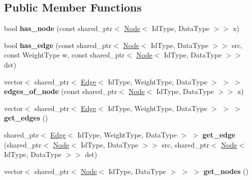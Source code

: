 \subsection*{Public Member Functions}
\begin{DoxyCompactItemize}
\item 
\mbox{\label{class_graph_a_l_a353837400673848253837aac9f8e371f}} 
bool {\bfseries has\+\_\+node} (const shared\+\_\+ptr$<$ \hyperlink{class_node}{Node}$<$ Id\+Type, Data\+Type $>$$>$ x)
\item 
\mbox{\label{class_graph_a_l_a656576f66ccc01e7e304d1185c964613}} 
bool {\bfseries has\+\_\+edge} (const shared\+\_\+ptr$<$ \hyperlink{class_node}{Node}$<$ Id\+Type, Data\+Type $>$$>$ src, const Weight\+Type w, const shared\+\_\+ptr$<$ \hyperlink{class_node}{Node}$<$ Id\+Type, Data\+Type $>$$>$ dst)
\item 
\mbox{\label{class_graph_a_l_a545256531ab0dd576f15e8ca1d948ad2}} 
vector$<$ shared\+\_\+ptr$<$ \hyperlink{class_edge}{Edge}$<$ Id\+Type, Weight\+Type, Data\+Type $>$ $>$ $>$ {\bfseries edges\+\_\+of\+\_\+node} (const shared\+\_\+ptr$<$ \hyperlink{class_node}{Node}$<$ Id\+Type, Data\+Type $>$$>$ x)
\item 
\mbox{\label{class_graph_a_l_a8057925080207f6b03eed78cd6fe89c1}} 
vector$<$ shared\+\_\+ptr$<$ \hyperlink{class_edge}{Edge}$<$ Id\+Type, Weight\+Type, Data\+Type $>$ $>$ $>$ {\bfseries get\+\_\+edges} ()
\item 
\mbox{\label{class_graph_a_l_a3738095ca2494093fc3d324d2157a13c}} 
shared\+\_\+ptr$<$ \hyperlink{class_edge}{Edge}$<$ Id\+Type, Weight\+Type, Data\+Type $>$ $>$ {\bfseries get\+\_\+edge} (shared\+\_\+ptr$<$ \hyperlink{class_node}{Node}$<$ Id\+Type, Data\+Type $>$$>$ src, shared\+\_\+ptr$<$ \hyperlink{class_node}{Node}$<$ Id\+Type, Data\+Type $>$$>$ dst)
\item 
\mbox{\label{class_graph_a_l_a1e621de0746bc97a1f8201cdd7bc867b}} 
vector$<$ shared\+\_\+ptr$<$ \hyperlink{class_node}{Node}$<$ Id\+Type, Data\+Type $>$ $>$ $>$ {\bfseries get\+\_\+nodes} ()
\item 
\mbox{\label{class_graph_a_l_ad819448fde92f796dcdd8c6866362453}} 

\end{DoxyCompactItemize}
